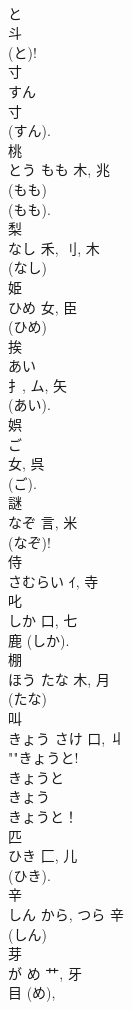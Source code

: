\documentclass[8pt]{extreport}
\begin{document}
\begin{CJK}{UTF8}{min}
\\	と	
\\	斗	
\\	(と)! 
\\	寸	
\\	すん	
\\	寸	
\\	(すん).	
\\	桃	
\\	とう	もも	木, 兆	
\\	(もも) 
\\	(もも).
\\	梨	
\\	なし	禾, 刂, 木	
\\	(なし) 
\\	姫	
\\	ひめ	女, 臣	
\\	(ひめ) 
\\	挨	
\\	あい	
\\	扌, ム, 矢	
\\	(あい). 
\\	娯	
\\	ご	
\\	女, 呉	
\\	(ご).	
\\	謎	
\\	なぞ	言, 米		
\\	(なぞ)! 
\\	侍	
\\	さむらい	ｲ, 寺	
\\	叱	
\\	しか	口, 七	
\\	鹿 (しか). 
\\	棚	
\\	ほう	たな	木, 月	
\\	(たな) 
\\	叫	
\\	きょう	さけ	口, 丩	
\\	""きょうと!
\\	きょうと 
\\	きょう 
\\	きょうと！	
\\	匹	
\\	ひき	匚, 儿	
\\	(ひき).	
\\	辛	
\\	しん	から, つら	辛	
\\	(しん) 
\\	芽	
\\	が	め	艹, 牙	
\\	目 (め), 

\end{CJK}
\end{document}
